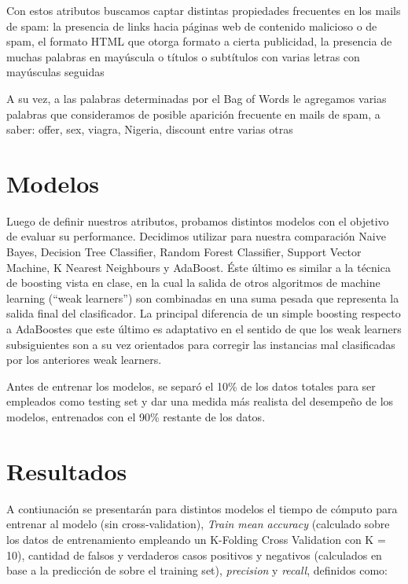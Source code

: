 \documentclass[10pt,a4paper]{article}
\begin{document}
Con estos atributos buscamos captar distintas propiedades frecuentes en los mails de spam: la presencia de links hacia páginas web de contenido malicioso o de spam, el formato HTML que otorga formato a cierta publicidad, la presencia de muchas palabras en mayúscula o títulos o subtítulos con varias letras con mayúsculas seguidas

A su vez, a las palabras determinadas por el Bag of Words le agregamos varias palabras que consideramos de posible aparición frecuente en mails de spam, a saber: offer, sex, viagra, Nigeria, discount entre varias otras

\section{Modelos}

Luego de definir nuestros atributos, probamos distintos modelos con el objetivo de evaluar su performance. Decidimos utilizar para nuestra comparación Naive Bayes, Decision Tree Classifier, Random Forest Classifier, Support Vector Machine, K Nearest Neighbours y AdaBoost. Éste último es similar a la técnica de boosting vista en clase, en la cual la salida de otros algoritmos de machine learning (``weak learners'') son combinadas en una suma pesada que representa la salida final del clasificador. La principal diferencia de un simple boosting respecto a AdaBoostes que este último es adaptativo en el sentido de que los weak learners subsiguientes son a su vez orientados para corregir las instancias mal clasificadas por los anteriores weak learners.

Antes de entrenar los modelos, se separó el 10\% de los datos totales para ser empleados como testing set y dar una medida más realista del desempeño de los modelos, entrenados con el 90\% restante de los datos.


\section{Resultados}

A contiunación se presentarán para distintos modelos el tiempo de cómputo para entrenar al modelo (sin cross-validation), \emph{Train mean accuracy} (calculado sobre los datos de entrenamiento empleando un K-Folding Cross Validation con K = 10), cantidad de falsos y verdaderos casos positivos y negativos (calculados en base a la predicción de sobre el training set), \textit{precision} y \textit{recall}, definidos como:
\end{document}
